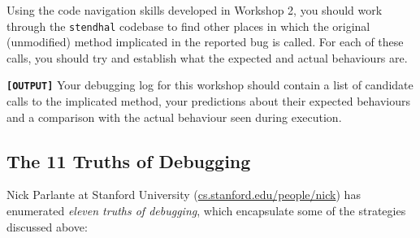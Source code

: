 \documentclass[
]{book}
\begin{document}
Using the code navigation skills developed in Workshop 2, you should work through the \texttt{stendhal} codebase to find other places in which the original (unmodified) method implicated in the reported bug is called. For each of these calls, you should try and establish what the expected and actual behaviours are.

\textbf{\texttt{{[}OUTPUT{]}}} Your debugging log for this workshop should contain a list of candidate calls to the implicated method, your predictions about their expected behaviours and a comparison with the actual behaviour seen during execution.

\hypertarget{truths}{%
\subsection{The 11 Truths of Debugging}\label{truths}}

Nick Parlante at Stanford University (\href{https://cs.stanford.edu/people/nick/}{cs.stanford.edu/people/nick}) has enumerated \emph{eleven truths of debugging}, which encapsulate some of the strategies discussed above:
\end{document}
